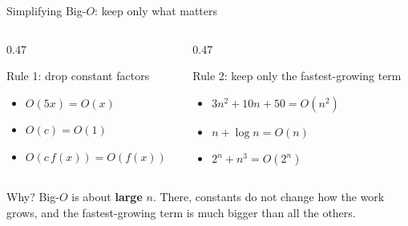 \documentclass[aspectratio=169]{beamer}
\begin{document}
\begin{frame}{Simplifying Big-$O$: keep only what matters}
\begin{columns}[T]
\begin{column}{0.47\textwidth}
\begin{block}{Rule 1: drop constant factors}
\begin{itemize}
  \item $O(5x) = O(x)$
  \item $O(c) = O(1)$
  \item $O(c\,f(x)) = O(f(x))$
\end{itemize}
\end{block}
\end{column}
\begin{column}{0.47\textwidth}
\begin{block}{Rule 2: keep only the fastest-growing term}
\begin{itemize}
  \item $3n^2 + 10n + 50 = O(n^2)$
  \item $n + \log n = O(n)$
  \item $2^n + n^{3} = O(2^n)$
\end{itemize}
\end{block}
\end{column}
\end{columns}
\vspace{0.4cm}
\begin{exampleblock}{Why?}
Big-$O$ is about \textbf{large} $n$. There, constants do not change how the work grows, and the fastest-growing term is much bigger than all the others.
\end{exampleblock}
\end{frame}
\end{document}
